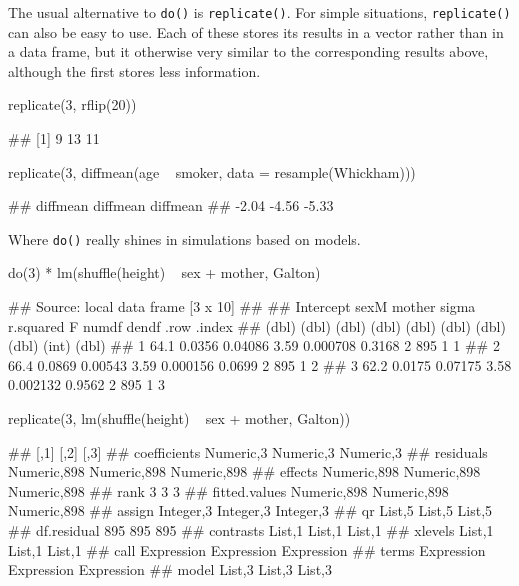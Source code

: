The usual alternative to \texttt{do()} is \texttt{replicate()}. For
simple situations, \texttt{replicate()} can also be easy to use. Each of
these stores its results in a vector rather than in a data frame, but it
otherwise very similar to the corresponding results above, although the
first stores less information.

\begin{Schunk}
\begin{Sinput}
replicate(3, rflip(20)) 
\end{Sinput}
\begin{Soutput}
## [1]  9 13 11
\end{Soutput}
\begin{Sinput}
replicate(3, diffmean(age ~ smoker, data = resample(Whickham)))
\end{Sinput}
\begin{Soutput}
## diffmean diffmean diffmean 
##    -2.04    -4.56    -5.33
\end{Soutput}
\end{Schunk}

Where \texttt{do()} really shines in simulations based on models.

\begin{Schunk}
\begin{Sinput}
do(3) * lm(shuffle(height) ~ sex + mother, Galton)
\end{Sinput}
\begin{Soutput}
## Source: local data frame [3 x 10]
## 
##   Intercept   sexM  mother sigma r.squared      F numdf dendf  .row .index
##       (dbl)  (dbl)   (dbl) (dbl)     (dbl)  (dbl) (dbl) (dbl) (int)  (dbl)
## 1      64.1 0.0356 0.04086  3.59  0.000708 0.3168     2   895     1      1
## 2      66.4 0.0869 0.00543  3.59  0.000156 0.0699     2   895     1      2
## 3      62.2 0.0175 0.07175  3.58  0.002132 0.9562     2   895     1      3
\end{Soutput}
\begin{Sinput}
replicate(3, lm(shuffle(height) ~ sex + mother, Galton))
\end{Sinput}
\begin{Soutput}
##               [,1]        [,2]        [,3]       
## coefficients  Numeric,3   Numeric,3   Numeric,3  
## residuals     Numeric,898 Numeric,898 Numeric,898
## effects       Numeric,898 Numeric,898 Numeric,898
## rank          3           3           3          
## fitted.values Numeric,898 Numeric,898 Numeric,898
## assign        Integer,3   Integer,3   Integer,3  
## qr            List,5      List,5      List,5     
## df.residual   895         895         895        
## contrasts     List,1      List,1      List,1     
## xlevels       List,1      List,1      List,1     
## call          Expression  Expression  Expression 
## terms         Expression  Expression  Expression 
## model         List,3      List,3      List,3
\end{Soutput}
\end{Schunk}

